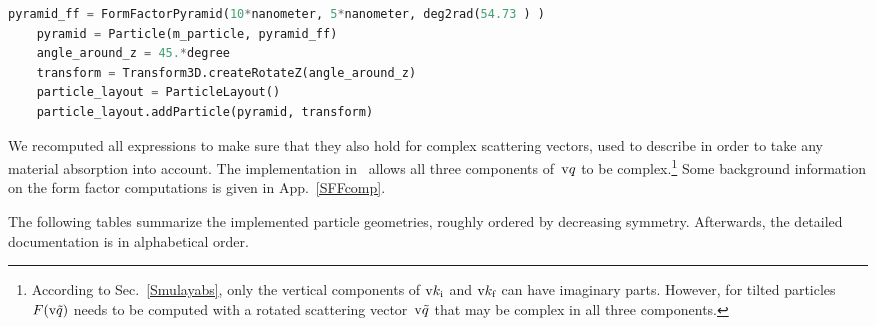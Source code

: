 \begin{lstlisting}[language=python, style=eclipseboxed,numbers=none,nolol]
    pyramid_ff = FormFactorPyramid(10*nanometer, 5*nanometer, deg2rad(54.73 ) )
    pyramid = Particle(m_particle, pyramid_ff)
    angle_around_z = 45.*degree
    transform = Transform3D.createRotateZ(angle_around_z)
    particle_layout = ParticleLayout()
    particle_layout.addParticle(pyramid, transform)
\end{lstlisting}


We recomputed all expressions to make sure
that they also hold for complex scattering vectors,
used to describe in order to take any material absorption into account.
The implementation in \BornAgain\ allows all three components
of~$\text{v}{q}$ to be complex.\footnote
{According to Sec.~\ref{Smulayabs},
only the vertical components of $\text{v}{k}_{\text{i}}$ and $\text{v}{k}_{\text{f}}$ can have imaginary parts.
However,
for tilted particles
$F(\text{v}{\tilde{q}})$ needs to be computed with
a rotated scattering vector~$\text{v}{\tilde q}$
that may be complex in all three components.}
Some background information on the form factor computations is
given in App.~\ref{SFFcomp}.

The following tables summarize the implemented particle geometries,
 roughly ordered by decreasing symmetry.
Afterwards, the detailed documentation is in alphabetical order.

